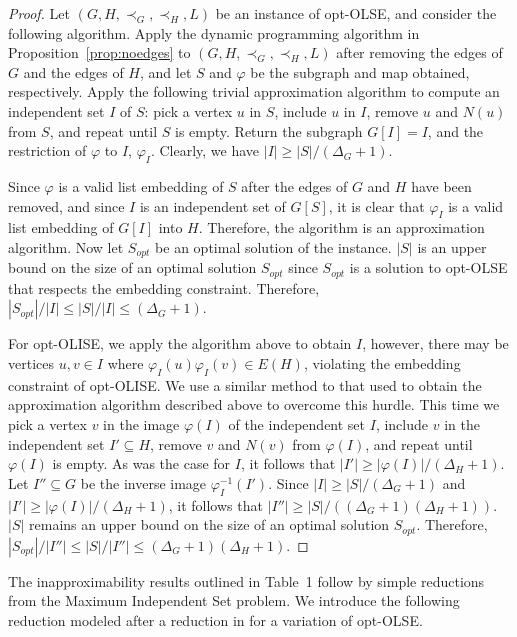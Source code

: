 \documentclass[11pt]{article}
\let\phi=\varphi
\begin{document}
\begin{proof}
Let $(G, H, \prec_G, \prec_H, L)$ be an instance of opt-OLSE, and consider the following algorithm. Apply the dynamic programming algorithm in Proposition~\ref{prop:noedges} to $(G, H, \prec_G, \prec_H, L)$ after removing the edges of $G$ and the edges of $H$, and let $S$ and $\phi$ be the subgraph and map obtained, respectively. Apply the following trivial approximation algorithm to compute an independent set $I$ of $S$: pick a vertex $u$ in $S$, include $u$ in $I$, remove $u$ and $N(u)$ from $S$, and repeat until $S$ is empty.  Return the subgraph $G[I]=I$, and the restriction of $\phi$ to $I$, $\phi_I$. Clearly, we have $|I| \geq |S|/(\Delta_G + 1)$.

Since $\phi$ is a valid list embedding of $S$ after the edges of $G$ and $H$ have been removed, and since $I$ is an independent set of $G[S]$, it is clear that $\phi_I$ is a valid list embedding of $G[I]$ into $H$. Therefore, the algorithm is an approximation algorithm. Now let $S_{opt}$ be an optimal solution of the instance. $|S|$ is an upper bound on the size of an optimal solution $S_{opt}$ since $S_{opt}$ is a solution to opt-OLSE that respects the embedding constraint. Therefore, $|S_{opt}|/|I| \leq |S|/|I| \leq (\Delta_G + 1)$.

For opt-OLISE, we apply the algorithm above to obtain $I$, however, there may be vertices $u,v \in I$ where $\phi_I(u)\phi_I(v) \in E(H)$, violating the embedding constraint of opt-OLISE.  We use a similar method to that used to obtain the approximation algorithm described above to overcome this hurdle. This time we pick a vertex $v$ in the image $\phi(I)$ of the independent set $I$, include $v$ in the independent set $I' \subseteq H$, remove $v$ and $N(v)$ from $\phi(I)$, and repeat until $\phi(I)$ is empty. As was the case for $I$, it follows that $|I'| \geq |\phi(I)|/(\Delta_H + 1)$. Let $I'' \subseteq G$ be the inverse image $\phi_I^{-1}(I')$. Since $|I| \geq |S|/(\Delta_G + 1)$ and $|I'| \geq |\phi(I)|/(\Delta_H + 1)$, it follows that $|I''| \geq |S|/((\Delta_G + 1)(\Delta_H + 1))$. $|S|$ remains an upper bound on the size of an optimal solution $S_{opt}$. Therefore, $|S_{opt}|/|I''| \leq |S|/|I''| \leq (\Delta_G + 1)(\Delta_H + 1)$. \end{proof}

The inapproximability results outlined in Table~1 follow by simple reductions from the {\sc Maximum Independent Set} problem.  We introduce the following reduction modeled after a reduction in \cite{xiuzhen} for a variation of opt-OLSE.
\end{document}

